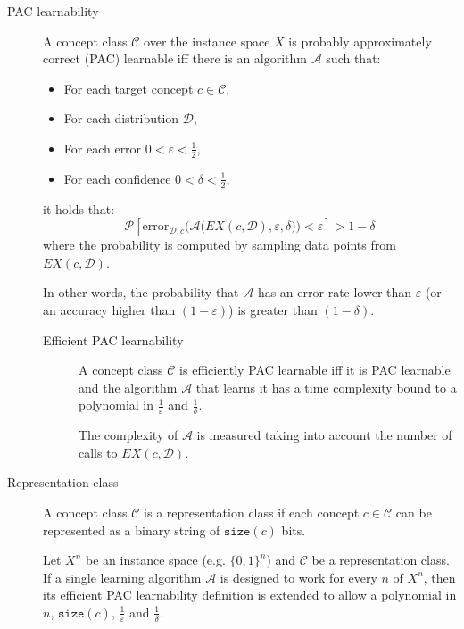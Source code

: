 \begin{description}
    \item[PAC learnability] 
        A concept class $\mathcal{C}$ over the instance space $X$ is probably approximately correct (PAC) learnable iff there is an algorithm $\mathcal{A}$ such that:
        \begin{itemize}
            \item For each target concept $c \in \mathcal{C}$,
            \item For each distribution $\mathcal{D}$, 
            \item For each error $0 < \varepsilon < \frac{1}{2}$,
            \item For each confidence $0 < \delta < \frac{1}{2}$,
        \end{itemize}
        it holds that:
        \[ \mathcal{P}\left[ \text{error}_{\mathcal{D}, c}\Big( \mathcal{A}\big( EX(c, \mathcal{D}), \varepsilon, \delta \big) \Big) < \varepsilon \right] > 1-\delta \]
        where the probability is computed by sampling data points from $EX(c, \mathcal{D})$.

        In other words, the probability that $\mathcal{A}$ has an error rate lower than $\varepsilon$ (or an accuracy higher than $(1-\varepsilon)$) is greater than $(1-\delta)$.

        \begin{description}
            \item[Efficient PAC learnability] 
                A concept class $\mathcal{C}$ is efficiently PAC learnable iff
                it is PAC learnable and the algorithm $\mathcal{A}$ that learns it has 
                a time complexity bound to a polynomial in $\frac{1}{\varepsilon}$ and $\frac{1}{\delta}$.

                \begin{remark}
                    The complexity of $\mathcal{A}$ is measured taking into account the number of calls to $EX(c, \mathcal{D})$.
                \end{remark}
        \end{description}

    \item[Representation class] 
        A concept class $\mathcal{C}$ is a representation class if
        each concept $c \in \mathcal{C}$ can be represented as a binary string of $\texttt{size}(c)$ bits.

        \begin{remark}
            Let $X^n$ be an instance space (e.g. $\{ 0, 1 \}^n$) and $\mathcal{C}$ be a representation class.
            If a single learning algorithm $\mathcal{A}$ is designed to work for every $n$ of $X^n$,
            then its efficient PAC learnability definition is extended to allow 
            a polynomial in $n$, $\texttt{size}(c)$, $\frac{1}{\varepsilon}$ and $\frac{1}{\delta}$.
        \end{remark}
\end{description}



